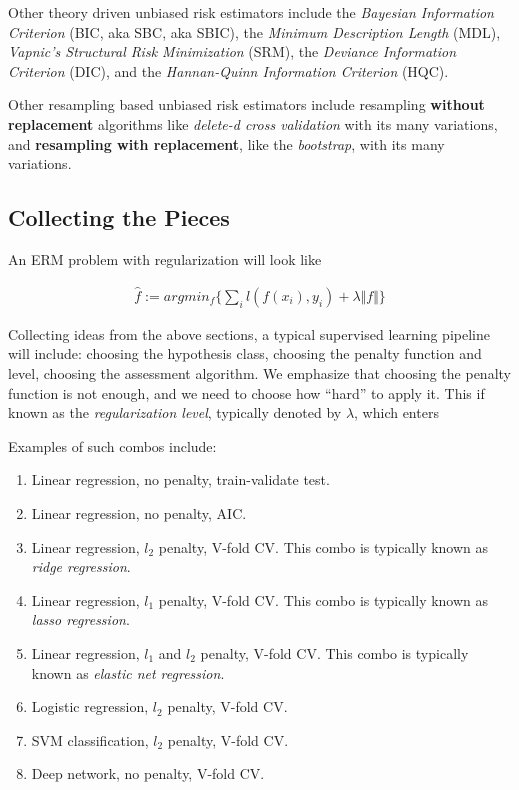 \documentclass[]{book}
\providecommand{\tightlist}{%
  \setlength{\itemsep}{0pt}\setlength{\parskip}{0pt}}
\theoremstyle{definition}
\theoremstyle{definition}
\theoremstyle{remark}
\begin{document}
Other theory driven unbiased risk estimators include the \emph{Bayesian
Information Criterion} (BIC, aka SBC, aka SBIC), the \emph{Minimum
Description Length} (MDL), \emph{Vapnic's Structural Risk Minimization}
(SRM), the \emph{Deviance Information Criterion} (DIC), and the
\emph{Hannan-Quinn Information Criterion} (HQC).

Other resampling based unbiased risk estimators include resampling
\textbf{without replacement} algorithms like \emph{delete-d cross
validation} with its many variations, and \textbf{resampling with
replacement}, like the \emph{bootstrap}, with its many variations.

\subsection{Collecting the Pieces}\label{collecting-the-pieces}

An ERM problem with regularization will look like

\begin{align}
  \hat f := argmin_f \{ \sum_i l(f(x_i),y_i)  + \lambda \Vert f \Vert \}
  \label{eq:erm-regularized}  
\end{align}

Collecting ideas from the above sections, a typical supervised learning
pipeline will include: choosing the hypothesis class, choosing the
penalty function and level, choosing the assessment algorithm. We
emphasize that choosing the penalty function is not enough, and we need
to choose how ``hard'' to apply it. This if known as the
\emph{regularization level}, typically denoted by \(\lambda\), which
enters

Examples of such combos include:

\begin{enumerate}
\def\labelenumi{\arabic{enumi}.}
\tightlist
\item
  Linear regression, no penalty, train-validate test.
\item
  Linear regression, no penalty, AIC.
\item
  Linear regression, \(l_2\) penalty, V-fold CV. This combo is typically
  known as \emph{ridge regression}.
\item
  Linear regression, \(l_1\) penalty, V-fold CV. This combo is typically
  known as \emph{lasso regression}.
\item
  Linear regression, \(l_1\) and \(l_2\) penalty, V-fold CV. This combo
  is typically known as \emph{elastic net regression}.
\item
  Logistic regression, \(l_2\) penalty, V-fold CV.
\item
  SVM classification, \(l_2\) penalty, V-fold CV.
\item
  Deep network, no penalty, V-fold CV.
\end{enumerate}
\end{document}
